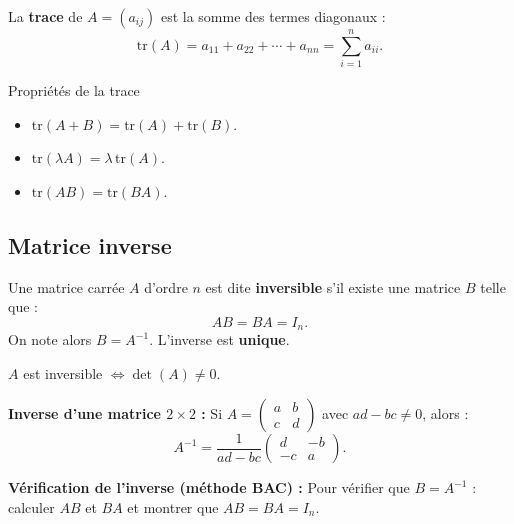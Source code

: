 \begin{definition}[Trace]
	La \textbf{trace} de $A=(a_{ij})$ est la somme des termes diagonaux :
	\[
	\mathrm{tr}(A) = a_{11} + a_{22} + \cdots + a_{nn} = \sum_{i=1}^n a_{ii}.
	\]
\end{definition}

\begin{propriete}{Propriétés de la trace}{}
	\begin{itemize}[label=\textbullet]
		\item $\mathrm{tr}(A+B) = \mathrm{tr}(A)+\mathrm{tr}(B)$.
		\item $\mathrm{tr}(\lambda A) = \lambda\,\mathrm{tr}(A)$.
		\item $\mathrm{tr}(AB) = \mathrm{tr}(BA)$.
	\end{itemize}
\end{propriete}

\subsection{Matrice inverse}

\begin{definition}
	Une matrice carrée $A$ d'ordre $n$ est dite \textbf{inversible} s'il existe
	une matrice $B$ telle que :
	\[
	AB = BA = I_n.
	\]
	On note alors $B = A^{-1}$. L'inverse est \textbf{unique}.
\end{definition}

\begin{theoreme}
	$A$ est inversible $\iff \det(A) \neq 0$.
\end{theoreme}

\begin{methode}
	\textbf{Inverse d'une matrice $2\times 2$ :}
	Si $A=\begin{pmatrix}a&b\\c&d\end{pmatrix}$ avec $ad-bc\neq 0$, alors :
	\[
	A^{-1} = \frac{1}{ad-bc}\begin{pmatrix}d&-b\\-c&a\end{pmatrix}.
	\]
\end{methode}

\begin{methode}
	\textbf{Vérification de l'inverse (méthode BAC) :}
	Pour vérifier que $B=A^{-1}$ : calculer $AB$ et $BA$ et montrer
	que $AB = BA = I_n$.
\end{methode}

